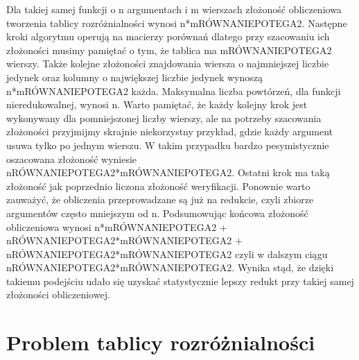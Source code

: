 Dla takiej samej funkcji o n argumentach i m wierszach złożoność obliczeniowa tworzenia tablicy rozróżnialności wynosi n*mRÓWNANIEPOTEGA2.
Następne kroki algorytmu operują na macierzy porównań dlatego przy szacowaniu ich złożoności musimy pamiętać o tym, że tablica ma mRÓWNANIEPOTEGA2 wierszy.
Także kolejne złożoności znajdowania wiersza o najmniejszej liczbie jedynek oraz kolumny o największej liczbie jedynek wynoszą n*mRÓWNANIEPOTEGA2 każda.
Maksymalna liczba powtórzeń, dla funkcji nieredukowalnej, wynosi n.
Warto pamiętać, że każdy kolejny krok jest wykonywany dla pomniejszonej liczby wierszy, ale na potrzeby szacowania złożoności przyjmijmy skrajnie niekorzystny przykład, gdzie każdy argument usuwa tylko po jednym wierszu.
W takim przypadku bardzo pesymistycznie oszacowana złożoność wyniesie nRÓWNANIEPOTEGA2*mRÓWNANIEPOTEGA2.
Ostatni krok ma taką złożoność jak poprzednio liczona złożoność weryfikacji.
Ponownie warto zauważyć, że obliczenia przeprowadzane są już na redukcie, czyli zbiorze argumentów często mniejszym od n.
Podsumowując końcowa złożoność obliczeniowa wynosi n*mRÓWNANIEPOTEGA2 + nRÓWNANIEPOTEGA2*mRÓWNANIEPOTEGA2 + nRÓWNANIEPOTEGA2*mRÓWNANIEPOTEGA2 czyli w dalszym ciągu nRÓWNANIEPOTEGA2*mRÓWNANIEPOTEGA2.
Wynika stąd, że dzięki takiemu podejściu udało się uzyskać statystycznie lepszy redukt przy takiej samej złożoności obliczeniowej.


\section{Problem tablicy rozróżnialności}

